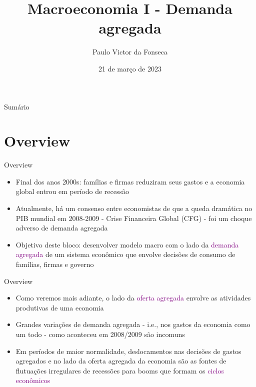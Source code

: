 \documentclass[10pt]{beamer}
\title[]{Macroeconomia I - Demanda agregada}
\author[]{Paulo Victor da Fonseca}
\date{21 de março de 2023}
\begin{document}
\begin{frame}[plain]
\end{frame}

\begin{frame}{Sumário}
    \tableofcontents
\end{frame}

\section{Overview}
\begin{frame}{Overview}
    \begin{itemize}
        \item Final dos anos 2000s: famílias e firmas reduziram seus gastos e a economia global entrou em período de recessão\bigskip
         
        \item Atualmente, há um consenso entre economistas de que a queda dramática no PIB mundial em 2008-2009 - Crise Financeira Global (CFG) - foi um choque adverso de demanda agregada\bigskip
         
        \item Objetivo deste bloco: desenvolver modelo macro com o lado da \textcolor{purple}{demanda agregada} de um sistema econômico que envolve decisões de consumo de famílias, firmas e governo
    \end{itemize}
\end{frame}

\begin{frame}{Overview}
    \begin{itemize}
        \item Como veremos mais adiante, o lado da \textcolor{purple}{oferta agregada} envolve as atividades produtivas de uma economia\bigskip
         
        \item Grandes variações de demanda agregada - i.e., nos gastos da economia como um todo - como aconteceu em 2008/2009 são incomuns\bigskip
         
        \item Em períodos de maior normalidade, deslocamentos nas decisões de gastos agregados e no lado da oferta agregada da economia são as fontes de flutuações irregulares de recessões para booms que formam os \textcolor{purple}{ciclos econômicos}
    \end{itemize}
\end{frame}
\end{document}
